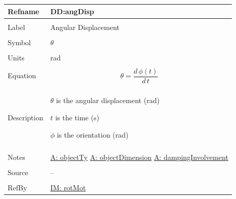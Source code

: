 \documentclass[12pt]{article}
\begin{document}
\noindent \begin{minipage}{\textwidth}
\begin{tabular}{p{} p{}}
\toprule \textbf{Refname} & \textbf{DD:angDisp}
\label{DD:angDisp}
\\ \midrule \\
Label & Angular Displacement
\\ \midrule \\
Symbol & $θ$
\\ \midrule \\
Units & rad
\\ \midrule \\
Equation & \begin{displaymath}
           θ=\frac{d\,ϕ\left(t\right)}{d\,t}
           \end{displaymath}
\\ \midrule \\
Description & \begin{symbDescription}
              \item{$θ$ is the angular displacement (rad)}
              \item{$t$ is the time (s)}
              \item{$ϕ$ is the orientation (rad)}
              \end{symbDescription}
\\ \midrule \\
Notes & \hyperref[assumpOT]{A: objectTy}
        \hyperref[assumpOD]{A: objectDimension}
        \hyperref[assumpDI]{A: dampingInvolvement}
\\ \midrule \\
Source & --
\\ \midrule \\
RefBy & \hyperref[IM:rotMot]{IM: rotMot}
\\ \bottomrule \end{tabular}
\end{minipage}
\par~
\end{document}
